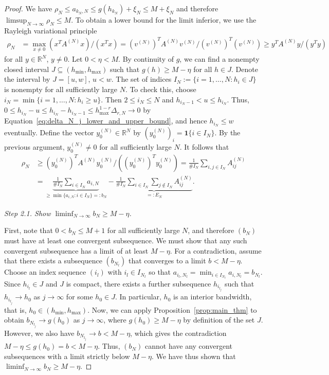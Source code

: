 \begin{proof}
    We have $\rho_N\le a_{k_N,N}\le g(h_{k_N})+\xi_N\le M+\xi_N$ and therefore $\limsup_{N\to\infty}\rho_N\le M$. To obtain a lower bound for the limit inferior, we use the Rayleigh variational principle
    \begin{align*}
        \rho_N&=\max_{x\ne 0}(x^{T}A^{(N)}x)/(x^{T}x)=(v^{(N)})^{T}A^{(N)}v^{(N)}/(v^{(N)})^{T}(v^{(N)})
        \ge y^{T}A^{(N)}y/(y^{T}y)
    \end{align*}
    for all $y\in\mathbb{R}^{N}$, $y\ne0$. Let $0<\eta<M$. By continuity of $g$, we can find a nonempty closed interval $J\subseteq(h_{\min},h_{\max})$ such that $g(h)\ge M-\eta$ for all $h\in J$. Denote the interval by $J=[u,w]$, $u<w$. The set of indices $I_N:=\{i=1,\dots,N:h_i\in J\}$ is nonempty for all sufficiently large $N$. To check this, choose $i_N=\min\{i=1,\dots,N:h_i\ge u\}$. Then $2\le i_N\le N$ and $h_{i_N-1}<u\le h_{i_N}$. Thus, $0\le h_{i_N}-u\le h_{i_N}-h_{i_N-1}\le h_{\max}^{1-r}\Delta_{r,N}\to0$ by Equation~\eqref{eq:delta_N_j_lower_and_upper_bound}, and hence $h_{i_N}\le w$ eventually. Define the vector $y_0^{(N)}\in\mathbb{R}^{N}$ by $(y_0^{(N)})_i=\mathbf{1}\{i\in I_N\}$. By the previous argument, $y_0^{(N)}\ne0$ for all sufficiently large $N$. It follows that
    \begin{equation}\label{eq:proof_main_thm2_00000}
        \begin{aligned}
            \rho_N&\ge(y_0^{(N)})^{T}A^{(N)}y_0^{(N)}/((y_0^{(N)})^{T}y_0^{(N)})=\frac{1}{\# I_N}\sum_{i,j\in I_N}A_{ij}^{(N)}\\&
        =\underbrace{\frac{1}{\#I_N}\sum_{i\in I_N}a_{i,N}}_{\ge\min\{a_{i,N}:i\in I_N\}=:b_N}-\underbrace{\frac{1}{\#I_N}\sum_{i\in I_N}\sum_{j\notin I_N}A_{ij}^{(N)}}_{=:E_N}.
        \end{aligned}
    \end{equation}

    \textit{Step 2.1. Show $\liminf_{N\to\infty}b_N\ge M-\eta$.}

    First, note that $0<b_N\le M+1$ for all sufficiently large $N$, and therefore $(b_N)$ must have at least one convergent subsequence. We must show that any such convergent subsequence has a limit of at least $M-\eta$. For a contradiction, assume that there exists a subsequence $(b_{N_l})$ that converges to a limit $b<M-\eta$. Choose an index sequence $(i_l)$ with $i_l\in I_{N_l}$ so that $a_{i_l,N_l}=\min_{i\in I_{N_l}}a_{i,N_l}=b_{N_l}$. Since $h_{i_l}\in J$ and $J$ is compact, there exists a further subsequence $h_{i_{l_j}}$ such that $h_{i_{l_j}}\to h_0$ as $j\to\infty$ for some $h_0\in J$. In particular, $h_0$ is an interior bandwidth, that is, $h_0\in(h_{\min},h_{\max})$. Now, we can apply Proposition~\ref{prop:main_thm} to obtain $b_{N_{l_j}}\to g(h_0)$ as $j\to\infty$, where $g(h_0)\ge M-\eta$ by definition of the set $J$. However, we also have $b_{N_{l_j}}\to b<M-\eta$, which gives the contradiction $M-\eta\le g(h_0)=b<M-\eta$. Thus, $(b_N)$ cannot have any convergent subsequences with a limit strictly below $M-\eta$. We have thus shown that $\liminf_{N\to\infty}b_N\ge M-\eta$.


\end{proof}
